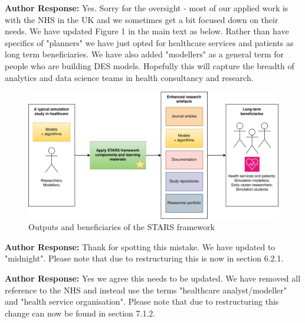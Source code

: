\documentclass{article}
\begin{document}
\vspace{0.2cm}

\noindent\textbf{Author Response:} Yes. Sorry for the oversight - most of our applied work is with the NHS in the UK and we sometimes get a bit focused down on their needs.  We have updated Figure 1 in the main text as below. Rather than have specifics of "planners" we have just opted for healthcare services and patients as long term beneficiaries.  We have also added "modellers" as a general term for people who are building DES models. Hopefully this will capture the breadth of analytics and data science teams in health consultancy and research.

\begin{figure}[h!]
\centering
    \includegraphics[scale=0.70]{images/stars_aims_paper.png}
    \caption{{\color{red}Outputs and beneficiaries of the STARS framework}}
    \label{fig:stars_aims}
\end{figure}

\vspace{0.5cm}


\vspace{0.2cm}

\noindent\textbf{Author Response:} Thank for spotting this mistake. We have updated to "midnight".  Please note that due to restructuring this is now in section 6.2.1.


\vspace{0.5cm}


\vspace{0.2cm}

\noindent\textbf{Author Response:} Yes we agree this needs to be updated. We have removed all reference to the NHS and instead use the terms {\color{red}"healthcare analyst/modeller"} and {\color{red}"health service organisation"}.  Please note that due to restructuring this change can now be found in section 7.1.2.
\end{document}
